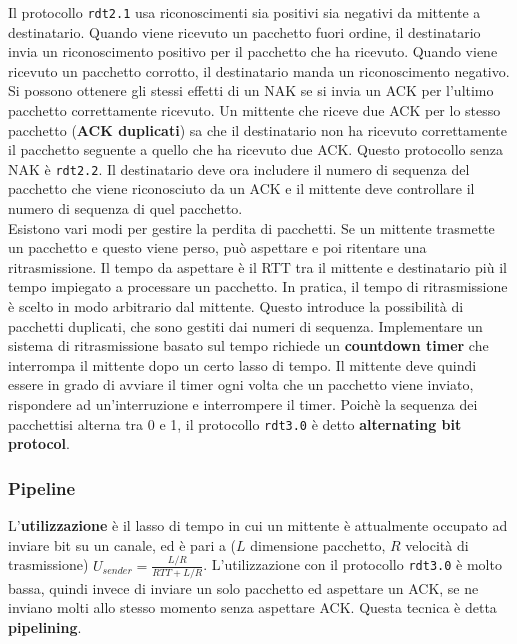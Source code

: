 \documentclass[11pt]{article}
\begin{document}
Il protocollo \texttt{rdt2.1} usa riconoscimenti sia positivi sia negativi da mittente a destinatario. Quando viene 
ricevuto un pacchetto fuori ordine, il destinatario invia un riconoscimento positivo per il pacchetto che ha ricevuto.
Quando viene ricevuto un pacchetto corrotto, il destinatario manda un riconoscimento negativo. \\
Si possono ottenere gli stessi effetti di un NAK se si invia un ACK per l'ultimo pacchetto correttamente ricevuto. 
Un mittente che riceve due ACK per lo stesso pacchetto (\textbf{ACK duplicati}) sa che il destinatario non ha ricevuto 
correttamente il pacchetto seguente a quello che ha ricevuto due ACK. Questo protocollo senza NAK è \texttt{rdt2.2}. Il 
destinatario deve ora includere il numero di sequenza del pacchetto che viene riconosciuto da un ACK e il mittente deve 
controllare il numero di sequenza di quel pacchetto.\\
Esistono vari modi per gestire la perdita di pacchetti. Se un mittente trasmette un pacchetto e questo viene perso, può 
aspettare e poi ritentare una ritrasmissione. Il tempo da aspettare è il RTT tra il mittente e destinatario più il tempo 
impiegato a processare un pacchetto. In pratica, il tempo di ritrasmissione è scelto in modo arbitrario dal mittente. 
Questo introduce la possibilità di pacchetti duplicati, che sono gestiti dai numeri di sequenza. Implementare un 
sistema di ritrasmissione basato sul tempo richiede un \textbf{countdown timer} che interrompa il mittente dopo un certo 
lasso di tempo. Il mittente deve quindi essere in grado di avviare il timer ogni volta che un pacchetto viene inviato, 
rispondere ad un'interruzione e interrompere il timer. Poichè la sequenza dei pacchettisi alterna tra 0 e 1, il protocollo 
\texttt{rdt3.0} è detto \textbf{alternating bit protocol}.
\subsubsection{Pipeline}
L'\textbf{utilizzazione} è il lasso di tempo in cui un mittente è attualmente occupato ad inviare bit su un canale, ed è 
pari a ($L$ dimensione pacchetto, $R$ velocità di trasmissione) $U_{sender} = \frac{L/R}{RTT+L/R}$. L'utilizzazione con 
il protocollo \texttt{rdt3.0} è molto bassa, quindi invece di inviare un solo pacchetto ed aspettare un ACK, se ne inviano 
molti allo stesso momento senza aspettare ACK. Questa tecnica è detta \textbf{pipelining}.
\end{document}
